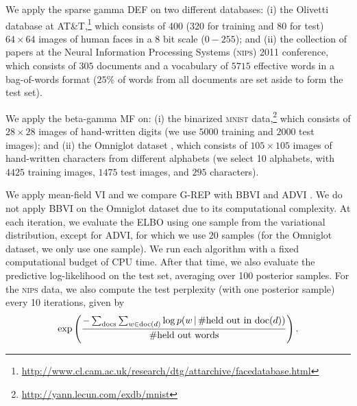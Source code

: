 We apply the sparse gamma \gls{DEF} on two different databases: (i) the Olivetti database at AT\&T,\footnote{\url{http://www.cl.cam.ac.uk/research/dtg/attarchive/facedatabase.html}} which consists of 400 (320 for training and 80 for test) $64\times 64$ images of human faces in a 8 bit scale ($0-255$); and (ii) the collection of papers at the Neural Information Processing Systems (\textsc{nips}) 2011 conference, which consists of $305$ documents and a vocabulary of $5715$ effective words in a bag-of-words format ($25\%$ of words from all documents are set aside to form the test set).

We apply the beta-gamma \gls{MF} on: (i) the binarized \textsc{mnist} data,\footnote{\url{http://yann.lecun.com/exdb/mnist}} which consists of $28\times 28$ images of hand-written digits (we use $5000$ training and $2000$ test images); and (ii) the Omniglot dataset \citep{Lake2015}, which consists of $105\times 105$ images of hand-written characters from different alphabets (we select 10 alphabets, with $4425$ training images, $1475$ test images, and $295$ characters).

\vspace*{-1pt}
We apply mean-field \gls{VI} and we compare \gls{G-REP} with \gls{BBVI} \citep{Ranganath2014} and \gls{ADVI} \citep{Kucukelbir2016}. We do not apply \gls{BBVI} on the Omniglot dataset due to its computational complexity.
%
At each iteration, we evaluate the \gls{ELBO} using one sample from the variational distribution, except for \gls{ADVI}, for which we use $20$ samples (for the Omniglot dataset, we only use one sample). We run each algorithm with a fixed computational budget of CPU time. After that time, we also evaluate the predictive log-likelihood on the test set, averaging over 100 posterior samples. For the \textsc{nips} data, we also compute the test perplexity (with one posterior sample) every 10 iterations, given by
\vspace*{-2pt}
\begin{equation}\nonumber
  \exp\left(\frac{-\sum_{\rm docs}\sum_{w\in \textrm{doc}(d)} \log p(w\, | \, \#\textrm{held out in doc}(d))}{\# \textrm{held out words}}\right).
\end{equation}

